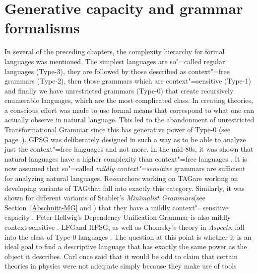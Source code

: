 
\chapter{Generative capacity and grammar formalisms}
\label{sec-generative-capacity}\label{chap-complexity}

In several of the preceding chapters,
the complexity hierarchy for formal languages was mentioned. The simplest languages are so"=called regular languages (Type-3),
they are followed by those described as context"=free grammars (Type-2), then those grammars which are 
context"=sensitive (Type-1) and finally we have unrestricted grammars (Type-0) that
create recursively enumerable languages, which are the most complicated class. In creating theories, a conscious effort was made to
use formal means that correspond to what one can actually observe in natural language.
This led to the abandonment of unrestricted Transformational Grammar since this has generative power of Type-0 (see page~\pageref{page-TG-Typ0}).
GPSG was deliberately designed in such a way as to be able to analyze just the context"=free
languages and not more. In the mid-80s, it was shown that natural languages have a higher complexity
than context"=free languages \citep{Shieber85a,Culy85a}. It is now assumed that so"=called
\emph{mildly context"=sensitive} grammars are sufficient for analyzing natural languages. Researchers 
working on TAG\indextag are working on developing variants of TAG\indextag that fall into exactly
this category. Similarly, it was shown for different variants of Stabler's \emph{Minimalist
  Grammars}\indexmg (see Section~\ref{Abschnitt-MG} and \citealp{Stabler2001a,Stabler2010b}) that they
have a mildly context"=sensitive capacity \citep{Michaelis2001a-u}. Peter Hellwig's Dependency
Unification Grammar is also mildly context-sensitive
\citep[]{Hellwig2003a}. 
LFG\indexlfg and HPSG\indexhpsg, as well as Chomsky's theory in \emph{Aspects}, fall into the class of Type-0 languages \citep{Berwick82a-u,Johnson88}.
The question at this point is whether it is an ideal goal to find a descriptive language that has exactly the same power as the object it describes.
Carl \citet{Pollard96a} once said that it would be odd to claim that certain theories in physics were not adequate simply because they make use of tools
